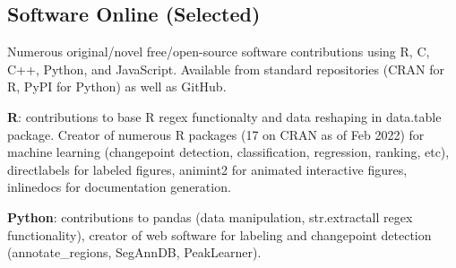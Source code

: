\documentclass[margin,line]{res}
\begin{document}
\begin{resume}
\section{\sc Software Online (Selected)} 

Numerous original/novel free/open-source software contributions using R, C, C++,
Python, and JavaScript. Available from standard repositories (CRAN for
R, PyPI for Python) as well as GitHub.

{\bf R}: contributions to base R regex functionalty and data reshaping
in data.table package. Creator of numerous R packages (17 on CRAN
as of Feb 2022) for machine learning (changepoint detection,
classification, regression, ranking, etc), directlabels for labeled
figures, animint2 for animated interactive figures, inlinedocs for
documentation generation.

{\bf Python}: contributions to pandas (data manipulation,
str.extractall regex functionality), creator of web
software for labeling and changepoint detection 
(annotate\_regions, SegAnnDB, PeakLearner).




\end{resume}
\end{document}
